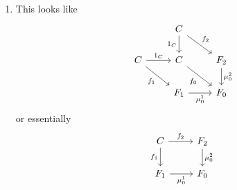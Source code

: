 \documentclass[12pt]{article}
\begin{document}
\begin{example}
\begin{enumerate}
	\item This looks like 
		\begin{equation*}
\begin{tikzcd}
                                      & C \arrow[d, "1_C"'] \arrow[rd, "f_2"] &                          \\
C \arrow[rd, "f_1"'] \arrow[r, "1_C"] & C \arrow[rd, "f_0"']                  & F_2 \arrow[d, "\mu^2_0"] \\
                                      & F_1 \arrow[r, "\mu^1_0"']             & F_0                     
\end{tikzcd}
		\end{equation*}
		or essentially 
		\begin{equation*}
\begin{tikzcd}
C \arrow[d, "f_1"'] \arrow[r, "f_2"] & F_2 \arrow[d, "\mu^2_0"] \\
F_1 \arrow[r, "\mu^1_0"']            & F_0                     
\end{tikzcd}
		\end{equation*}


\end{enumerate}
\end{example}
\end{document}
